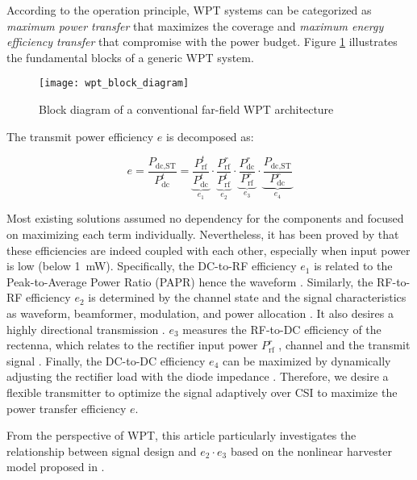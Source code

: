 According to the operation principle, WPT systems can be categorized as \textit{maximum power transfer} that maximizes the coverage and \textit{maximum energy efficiency transfer} \cite{Hui2014} that compromise with the power budget. Figure \ref{fig:wpt-block-diagram} illustrates the fundamental blocks of a generic WPT system.

\begin{figure}
  \centering
    \texttt{[image: wpt\_block\_diagram]}
  \caption{Block diagram of a conventional far-field WPT architecture \cite{Clerckx2018a}}
  \label{fig:wpt-block-diagram}
\end{figure}

The transmit power efficiency $e$ is decomposed as:

\begin{equation}\label{eqn:power_utilization_efficiency}
  e = \frac{{{P_{{\text{dc}},{\text{ST}}}}}}{{P_{{\text{dc}}}^t}} = \underbrace {\frac{{P_{{\text{rf}}}^t}}{{P_{{\text{dc}}}^t}}}_{{e_1}} \cdot \underbrace {\frac{{P_{{\text{rf}}}^r}}{{P_{{\text{rf}}}^t}}}_{{e_2}} \cdot \underbrace {\frac{{P_{{\text{dc}}}^r}}{{P_{{\text{rf}}}^r}}}_{{e_3}} \cdot \underbrace {\frac{{{P_{{\text{dc}},{\text{ST}}}}}}{{P_{{\text{dc}}}^r}}}_{{e_4}}
\end{equation}

Most existing solutions assumed no dependency for the components and focused on maximizing each term individually. Nevertheless, it has been proved by \cite{Boshkovska2015, Clerckx2016, Zeng2017} that these efficiencies are indeed coupled with each other, especially when input power is low (below 1~mW). Specifically, the DC-to-RF efficiency ${e_1}$ is related to the Peak-to-Average Power Ratio (PAPR) hence the waveform \cite{Boaventura2011}. Similarly, the RF-to-RF efficiency ${e_2}$ is determined by the channel state and the signal characteristics as waveform, beamformer, modulation, and power allocation \cite{Clerckx2019}. It also desires a highly directional transmission \cite{Takahashi2011}. ${e_3}$ measures the RF-to-DC efficiency of the rectenna, which relates to the rectifier input power ${P_{{\text{rf}}}^r}$ \cite{Trotter2009, Chen2017, Clerckx2018a}, channel and the transmit signal \cite{Collado2014, Boaventura2015, Clerckx2019}. Finally, the DC-to-DC efficiency ${e_4}$ can be maximized by dynamically adjusting the rectifier load with the diode impedance \cite{Dolgov2010}. Therefore, we desire a flexible transmitter to optimize the signal adaptively over CSI to maximize the power transfer efficiency $e$.

From the perspective of WPT, this article particularly investigates the relationship between signal design and ${e_2} \cdot {e_3}$ based on the nonlinear harvester model proposed in \cite{Clerckx2016}.
